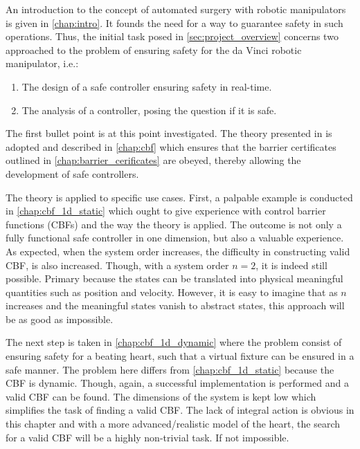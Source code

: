 An introduction to the concept of automated surgery with robotic manipulators is given in \autoref{chap:intro}. It founds the need for a way to guarantee safety in such operations. Thus, the initial task posed in \autoref{sec:project_overview} concerns two approached to the problem of ensuring safety for the da Vinci robotic manipulator, i.e.:
\begin{enumerate}
\item The design of a safe controller ensuring safety in real-time. 
\item The analysis of a controller, posing the question if it is safe. 
\end{enumerate}
The first bullet point is at this point investigated. The theory presented in \citep{bib:org_control} is adopted and described in \autoref{chap:cbf} which ensures that the barrier certificates outlined in \autoref{chap:barrier_cerificates} are obeyed, thereby allowing the development of safe controllers.

The theory is applied to specific use cases. First, a palpable example is conducted in \autoref{chap:cbf_1d_static} which ought to give experience with control barrier functions (CBFs) and the way the theory is applied. The outcome is not only a fully functional safe controller in one dimension, but also a valuable experience. As expected, when the system order increases, the difficulty in constructing valid CBF, is also increased. Though, with a system order $n=2$, it is indeed still possible. Primary because the states can be translated into physical meaningful quantities such as position and velocity. However, it is easy to imagine that as $n$ increases and the meaningful states vanish to abstract states, this approach will be as good as impossible.

The next step is taken in \autoref{chap:cbf_1d_dynamic} where the problem consist of ensuring safety for a beating heart, such that a virtual fixture can be ensured in a safe manner. The problem here differs from \autoref{chap:cbf_1d_static} because the CBF is dynamic. Though, again, a successful implementation is performed and a valid CBF can be found. The dimensions of the system is kept low which simplifies the task of finding a valid CBF. The lack of integral action is obvious in this chapter and with a more advanced/realistic model of the heart, the search for a valid CBF will be a highly non-trivial task. If not impossible.

